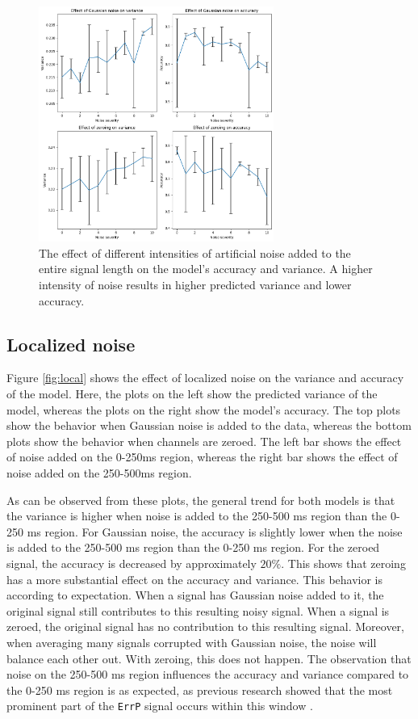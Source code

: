 \begin{figure}[!tbp]
    \centering
        \includegraphics[width=7.7cm]{img/general.png}
    \caption{The effect of different intensities of artificial noise added to the entire signal length on the model's accuracy and variance. A higher intensity of noise results in higher predicted variance and lower accuracy.}
    \label{fig:general}
\end{figure}

\subsection{Localized noise}

Figure \ref{fig:local} shows the effect of localized noise on the variance and accuracy of the model. Here, the plots on the left show the predicted variance of the model, whereas the plots on the right show the model's accuracy. The top plots show the behavior when Gaussian noise is added to the data, whereas the bottom plots show the behavior when channels are zeroed. The left bar shows the effect of noise added on the 0-250ms region, whereas the right bar shows the effect of noise added on the 250-500ms region.

As can be observed from these plots, the general trend for both models is that the variance is higher when noise is added to the 250-500 ms region than the 0-250 ms region. For Gaussian noise, the accuracy is slightly lower when the noise is added to the 250-500 ms region than the 0-250 ms region. For the zeroed signal, the accuracy is decreased by approximately $20\%$. This shows that zeroing has a more substantial effect on the accuracy and variance. This behavior is according to expectation. When a signal has Gaussian noise added to it, the original signal still contributes to this resulting noisy signal. When a signal is zeroed, the original signal has no contribution to this resulting signal. Moreover, when averaging many signals corrupted with Gaussian noise, the noise will balance each other out. With zeroing, this does not happen. The observation that noise on the 250-500 ms region influences the accuracy and variance compared to the 0-250 ms region is as expected, as previous research showed that the most prominent part of the \verb|ErrP| signal occurs within this window \citep{lopes2021online, omedes2015analysis}. 


